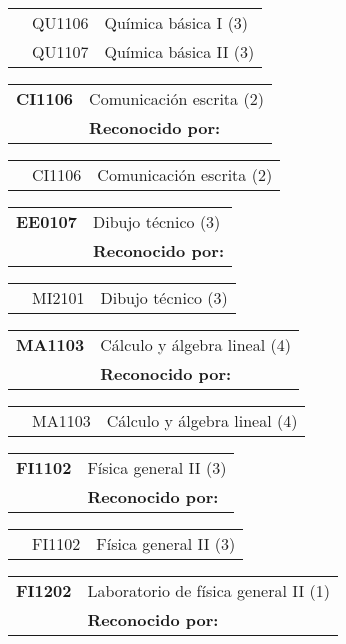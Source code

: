\documentclass[letterpaper]{article}%
\begin{document}
\begin{tabularx}{\textwidth}{p{1.5cm}p{1.5cm}p{10cm}}%
&QU1106&Química básica I (3)\\%
&QU1107&Química básica II (3)\\%
\end{tabularx}%
\begin{tabularx}{\textwidth}{p{1.5cm}p{10cm}}%
\textbf{CI1106}&Comunicación escrita (2)\\%
&\textbf{Reconocido por: }\\%
\end{tabularx}%
\begin{tabularx}{\textwidth}{p{1.5cm}p{1.5cm}p{10cm}}%
&CI1106&Comunicación escrita (2)\\%
\end{tabularx}%
\begin{tabularx}{\textwidth}{p{1.5cm}p{10cm}}%
\textbf{EE0107}&Dibujo técnico (3)\\%
&\textbf{Reconocido por: }\\%
\end{tabularx}%
\begin{tabularx}{\textwidth}{p{1.5cm}p{1.5cm}p{10cm}}%
&MI2101&Dibujo técnico (3)\\%
\end{tabularx}%
\begin{tabularx}{\textwidth}{p{1.5cm}p{10cm}}%
\textbf{MA1103}&Cálculo y álgebra lineal (4)\\%
&\textbf{Reconocido por: }\\%
\end{tabularx}%
\begin{tabularx}{\textwidth}{p{1.5cm}p{1.5cm}p{10cm}}%
&MA1103&Cálculo y álgebra lineal (4)\\%
\end{tabularx}%
\begin{tabularx}{\textwidth}{p{1.5cm}p{10cm}}%
\textbf{FI1102}&Física general II (3)\\%
&\textbf{Reconocido por: }\\%
\end{tabularx}%
\begin{tabularx}{\textwidth}{p{1.5cm}p{1.5cm}p{10cm}}%
&FI1102&Física general II (3)\\%
\end{tabularx}%
\begin{tabularx}{\textwidth}{p{1.5cm}p{10cm}}%
\textbf{FI1202}&Laboratorio de física general II (1)\\%
&\textbf{Reconocido por: }\\%
\end{tabularx}%
\end{document}
